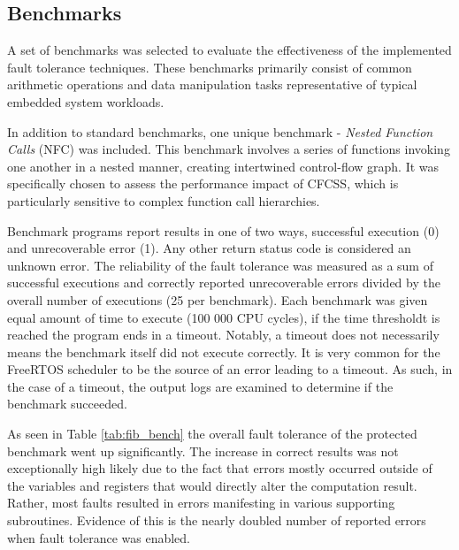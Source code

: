 \subsection{Benchmarks}

A set of benchmarks was selected to evaluate the effectiveness of the implemented fault tolerance techniques. These benchmarks primarily consist of common arithmetic operations and data manipulation tasks representative of typical embedded system workloads. 

In addition to standard benchmarks, one unique benchmark - \textit{Nested Function Calls} (NFC) was included. This benchmark involves a series of functions invoking one another in a nested manner, creating intertwined control-flow graph. It was specifically chosen to assess the performance impact of CFCSS, which is particularly sensitive to complex function call hierarchies.

Benchmark programs report results in one of two ways, successful execution (0) and unrecoverable error (1). Any other return status code is considered an unknown error. The reliability of the fault tolerance was measured as a sum of successful executions and correctly reported unrecoverable errors divided by the overall number of executions (25 per benchmark). Each benchmark was given equal amount of time to execute (100 000 CPU cycles), if the time thresholdt is reached the program ends in a timeout. Notably, a timeout does not necessarily means the benchmark itself did not execute correctly. It is very common for the FreeRTOS scheduler to be the source of an error leading to a timeout. As such, in the case of a timeout, the output logs are examined to determine if the benchmark succeeded.

\begin{table}[h]
\centering
{}
\caption{Fibonacci sequence benchmark statistics}
\label{tab:fib_bench}
\end{table}

As seen in Table \ref{tab:fib_bench} the overall fault tolerance of the protected benchmark went up significantly. The increase in correct results was not exceptionally high likely due to the fact that errors mostly occurred outside of the variables and registers that would directly alter the computation result. Rather, most faults resulted in errors manifesting in various supporting subroutines. Evidence of this is the nearly doubled number of reported errors when fault tolerance was enabled.

